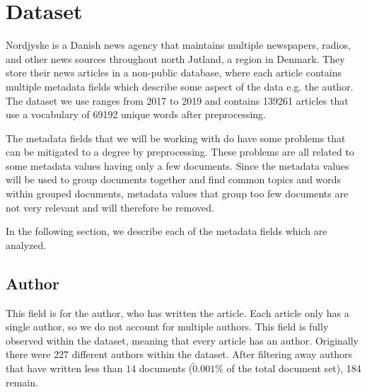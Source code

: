 \section{Dataset}\label{sec:dataset}
Nordjyske is a Danish news agency that maintains multiple newspapers, radios, and other news sources throughout north Jutland, a region in Denmark.
They store their news articles in a non-public database, where each article contains multiple metadata fields which describe some aspect of the data e.g. the author.
The dataset we use ranges from 2017 to 2019 and contains 139261 articles that use a vocabulary of 69192 unique words after preprocessing.

The metadata fields that we will be working with do have some problems that can be mitigated to a degree by preprocessing.
These problems are all related to some metadata values having only a few documents.
Since the metadata values will be used to group documents together and find common topics and words within grouped documents, metadata values that group too few documents are not very relevant and will therefore be removed.

In the following section, we describe each of the metadata fields which are analyzed.

\subsection{Author}
This field is for the author, who has written the article.
Each article only has a single author, so we do not account for multiple authors.
This field is fully observed within the dataset, meaning that every article has an author.
Originally there were $227$ different authors within the dataset.
After filtering away authors that have written less than $14$ documents ($\tilde0.001\%$ of the total document set), 184 remain.

